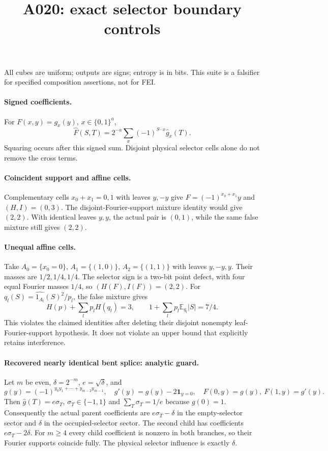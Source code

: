 \documentclass{article}
\begin{document}
\title{A020: exact selector boundary controls}\maketitle
All cubes are uniform; outputs are signs; entropy is in bits.
This suite is a falsifier for specified composition assertions, not for FEI.

\paragraph{Signed coefficients.}
For $F(x,y)=g_x(y)$, $x\in\{0,1\}^a$,
\[
 \widehat F(S,T)=2^{-a}\sum_x(-1)^{S\cdot x}\widehat g_x(T).
\]
Squaring occurs after this signed sum. Disjoint physical selector cells
alone do not remove the cross terms.

\paragraph{Coincident support and affine cells.}
Complementary cells $x_0+x_1=0,1$ with leaves $y,-y$ give
$F=(-1)^{x_0+x_1}y$ and $(H,I)=(0,3)$.
The disjoint-Fourier-support mixture identity would give $(2,2)$.
With identical leaves $y,y$, the actual pair is $(0,1)$, while the same
false mixture still gives $(2,2)$.

\paragraph{Unequal affine cells.}
Take $A_0=\{x_0=0\}$, $A_1=\{(1,0)\}$, $A_2=\{(1,1)\}$ with
leaves $y,-y,y$. Their masses are $1/2,1/4,1/4$.
The selector sign is a two-bit point defect, with four equal Fourier
masses $1/4$, so $(H(F),I(F))=(2,2)$.
For $q_l(S)=\widehat{1_{A_l}}(S)^2/p_l$, the false mixture gives
\[
 H(p)+\sum_l p_lH(q_l)=3,\qquad
 1+\sum_l p_l\mathbb E_{q_l}|S|=7/4.
\]
This violates the claimed identities after deleting their disjoint
nonempty leaf-Fourier-support hypothesis. It does not violate an upper
bound that explicitly retains interference.

\paragraph{Recovered nearly identical bent splice: analytic guard.}
Let $m$ be even, $\delta=2^{-m}$, $e=\sqrt\delta$, and
\[
 g(y)=(-1)^{y_0y_1+\cdots+y_{m-2}y_{m-1}},\quad
 g'(y)=g(y)-2\mathbf1_{y=0},\quad F(0,y)=g(y),\ F(1,y)=g'(y).
\]
Then $\widehat g(T)=e\sigma_T$, $\sigma_T\in\{-1,1\}$ and
$\sum_T\sigma_T=1/e$ because $g(0)=1$. Consequently the actual parent
coefficients are $e\sigma_T-\delta$ in the empty-selector sector and
$\delta$ in the occupied-selector sector. The second child has
coefficients $e\sigma_T-2\delta$. For $m\ge4$ every child coefficient
is nonzero in both branches, so their Fourier supports coincide fully.
The physical selector influence is exactly $\delta$.
\end{document}
